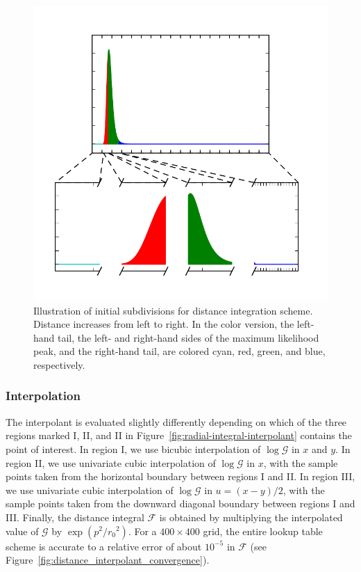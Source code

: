 \documentclass[amsmath,amssymb,aps,prx,reprint,nopreprintnumbers,nofootinbib,showpacs]{revtex4-1}
\begin{document}
\begin{figure}
    \begin{center}
        \includegraphics[width=\columnwidth]{radial_integrand}
    \end{center}
    \caption{\label{fig:radial_integrand}Illustration of initial subdivisions for distance integration scheme. Distance increases from left to right. In the color version, the left\nobreakdashes-hand tail, the left\nobreakdashes- and right\nobreakdashes-hand sides of the maximum likelihood peak, and the right\nobreakdashes-hand tail, are colored cyan, red, green, and blue, respectively.}
\end{figure}

\subsubsection{Interpolation}

The interpolant is evaluated slightly differently depending on which of the three regions marked I, II, and II in Figure~\ref{fig:radial-integral-interpolant} contains the point of interest. In region I, we use bicubic interpolation of $\log \mathcal{G}$ in $x$ and $y$. In region II, we use univariate cubic interpolation of $\log \mathcal{G}$ in $x$, with the sample points taken from the horizontal boundary between regions I and II. In region III, we use univariate cubic interpolation of $\log \mathcal{G}$ in $u = (x - y) / 2$, with the sample points taken from the downward diagonal boundary between regions I and III. Finally, the distance integral $\mathscr{F}$ is obtained by multiplying the interpolated value of $\mathscr{G}$ by $\exp\left(p^2/{r_0}^2\right)$. For a $400\times400$ grid, the entire lookup table scheme is accurate to a relative error of about $10^{-5}$ in $\mathscr{F}$ (see Figure~\ref{fig:distance_interpolant_convergence}).
\end{document}
